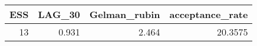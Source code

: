 \begin{longtable}{rrrr}
\toprule
ESS & LAG\_30 & Gelman\_rubin & acceptance\_rate \\ 
\midrule
13 & 0.931 & 2.464 & 20.3575 \\ 
\bottomrule
\end{longtable}

